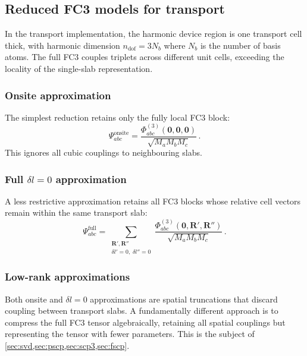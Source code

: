 \documentclass[11pt]{article}
\newcommand{\vc}[1]{\bm{#1}}
\newcommand{\ndof}{n_{\mathrm{dof}}}
\newcommand{\vR}{\vc{R}}
\begin{document}
\subsection{Reduced FC3 models for transport}
\label{sec:assembly_fc3}

In the transport implementation, the harmonic device region is one
transport cell thick, with harmonic dimension $\ndof = 3N_b$ where
$N_b$ is the number of basis atoms.  The full FC3 couples triplets
across different unit cells, exceeding the locality of the single-slab
representation.

\subsubsection{Onsite approximation}

The simplest reduction retains only the fully local FC3 block:
\begin{equation}
  \Psi_{abc}^{\mathrm{onsite}}
  = \frac{\Phi^{(3)}_{abc}(\vc{0},\vc{0},\vc{0})}
         {\sqrt{M_a M_b M_c}}\,.
\end{equation}
This ignores all cubic couplings to neighbouring slabs.

\subsubsection{Full $\delta l = 0$ approximation}

A less restrictive approximation retains all FC3 blocks whose relative
cell vectors remain within the same transport slab:
\begin{equation}\label{eq:fc3_full}
  \Psi_{abc}^{\mathrm{full}}
  = \sum_{\substack{\vR',\vR'' \\
                    \delta l' = 0,\;\delta l'' = 0}}
  \frac{\Phi^{(3)}_{abc}(\vc{0},\vR',\vR'')}
       {\sqrt{M_a M_b M_c}}\,.
\end{equation}

\subsubsection{Low-rank approximations}

Both onsite and $\delta l = 0$ approximations are spatial truncations
that discard coupling between transport slabs.  A fundamentally
different approach is to compress the full FC3 tensor algebraically,
retaining all spatial couplings but representing the tensor with fewer
parameters.  This is the subject of
\cref{sec:svd,sec:pscp,sec:scp3,sec:fscp}.
\end{document}
